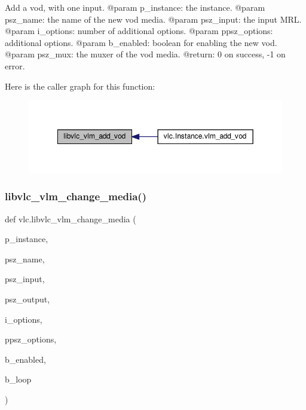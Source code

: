 \begin{DoxyVerb}Add a vod, with one input.
@param p_instance: the instance.
@param psz_name: the name of the new vod media.
@param psz_input: the input MRL.
@param i_options: number of additional options.
@param ppsz_options: additional options.
@param b_enabled: boolean for enabling the new vod.
@param psz_mux: the muxer of the vod media.
@return: 0 on success, -1 on error.
\end{DoxyVerb}
 Here is the caller graph for this function\+:
\nopagebreak
\begin{figure}[H]
\begin{center}
\leavevmode
\includegraphics[width=349pt]{namespacevlc_a2ce4add01e56693cb8ca2fdefa8233bb_icgraph}
\end{center}
\end{figure}
\mbox{\label{namespacevlc_ad4124336e48ffb5c6aef3bd166c3ff77}} 
\subsubsection{\texorpdfstring{libvlc\+\_\+vlm\+\_\+change\+\_\+media()}{libvlc\_vlm\_change\_media()}}
{\footnotesize\ttfamily def vlc.\+libvlc\+\_\+vlm\+\_\+change\+\_\+media (\begin{DoxyParamCaption}\item[{}]{p\+\_\+instance,  }\item[{}]{psz\+\_\+name,  }\item[{}]{psz\+\_\+input,  }\item[{}]{psz\+\_\+output,  }\item[{}]{i\+\_\+options,  }\item[{}]{ppsz\+\_\+options,  }\item[{}]{b\+\_\+enabled,  }\item[{}]{b\+\_\+loop }\end{DoxyParamCaption})}


